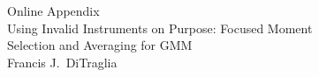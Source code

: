 \documentclass[12pt]{article}
\begin{document}
\appendix
\normalsize
\clearpage
{}%
\renewcommand*{\thepage}{A-\arabic{page}}
\begin{center}
  {\Huge Online Appendix\\}
  \vspace{1em}
  {\Large Using Invalid Instruments on Purpose: Focused Moment \\
  Selection and Averaging for GMM \\}
  \vspace{2em}
  {\large Francis J.\ DiTraglia} %
\end{center}







\end{document}
